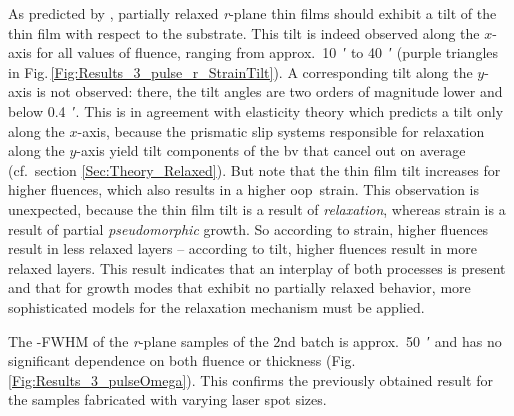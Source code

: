 As predicted by \textcite{grundmann2020b}, partially relaxed \textit{r}-plane thin films should exhibit a tilt of the thin film with respect to the substrate.
This tilt is indeed observed along the $x$-axis for all values of fluence, ranging from approx.\ \qty{10}{\arcminute} to \qty{40}{\arcminute} (purple triangles in Fig.\,\ref{Fig:Results_3_pulse_r_StrainTilt}).
A corresponding tilt along the $y$-axis is not observed: there, the tilt angles are two orders of magnitude lower and below \qty{0.4}{\arcminute}.
This is in agreement with elasticity theory which predicts a tilt only along the $x$-axis, because the prismatic slip systems responsible for relaxation along the $y$-axis yield tilt components of the \gls{bv} that cancel out on average (cf.\ section \ref{Sec:Theory_Relaxed}).
But note that the thin film tilt increases for higher fluences, which also results in a higher \gls{oop}\ strain.
This observation is unexpected, because the thin film tilt is a result of \emph{relaxation}, whereas strain is a result of partial \emph{pseudomorphic} growth.
So according to strain, higher fluences result in less relaxed layers -- according to tilt, higher fluences result in more relaxed layers.
This result indicates that an interplay of both processes is present and that for growth modes that exhibit no partially relaxed behavior, more sophisticated models for the relaxation mechanism must be applied.

The \textomega-FWHM of the \textit{r}-plane samples of the 2nd batch is approx.\ \qty{50}{\arcminute} and has no significant dependence on both fluence or thickness (Fig.\,\ref{Fig:Results_3_pulseOmega}).
This confirms the previously obtained result for the samples fabricated with varying laser spot sizes.